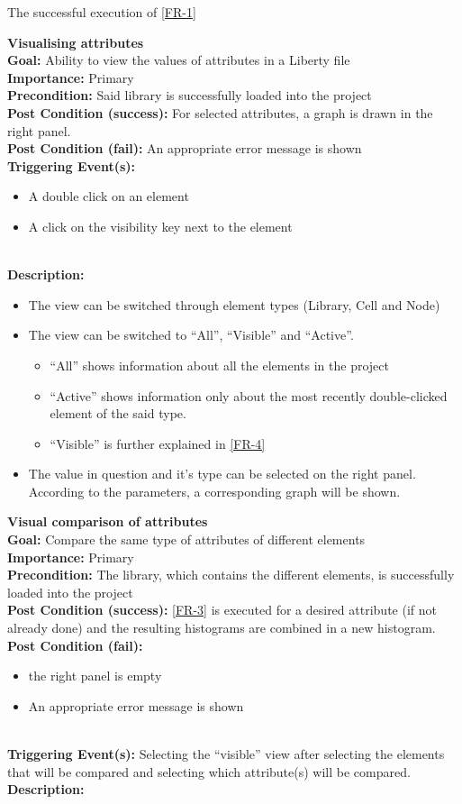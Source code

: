 \documentclass[10pt,a4paper]{report}
\newcommand{\precondition}[1]{
    \textbf{Precondition: } #1 \leavevmode \\
}
\newcommand{\FRDescription}[8]{
    \textbf{#1} \leavevmode \\
    \textbf{Goal: } #2 \leavevmode \\
    \textbf{Importance: } #3 \leavevmode \\
    \precondition{#4}
    \textbf{Post Condition (success): } #5 \leavevmode \\
    \textbf{Post Condition (fail): } #6 \leavevmode \\
    \textbf{Triggering Event(s): } #7 \leavevmode \\
    \textbf{Description: } \leavevmode \\ 
    #8}
\begin{document}
\begin{FR}
{\begin{itemize}
    \end{itemize}}
    {The successful execution of \ref{FR-1}}
    \item \FRDescription{Visualising attributes}
    {Ability to view the values of attributes in a Liberty file}
    {Primary}
    {Said library is successfully loaded into the project}
    {For selected attributes, a graph is drawn in the right panel.}
    {An appropriate error message is shown}
    {\begin{itemize}
        \item A double click on an element
        \item A click on the visibility key next to the element
    \end{itemize}}
    {\begin{itemize}
        \item The view can be switched through element types (Library, Cell and Node)
        \item The view can be switched to “All”, “Visible” and “Active”.
        \begin{itemize}
            \item “All” shows information about all the elements in the project
            \item “Active” shows information only about the most recently double-clicked element of the said type.
            \item “Visible” is further explained in \ref{FR-4}
        \end{itemize}
        \item The value in question and it’s type can be selected on the right panel. According to the parameters, a corresponding graph will be shown.
    \end{itemize}}
    \item \FRDescription{Visual comparison of attributes}
    {Compare the same type of attributes of different elements}
    {Primary}
    {The library, which contains the different elements,  is successfully loaded into the project}
    {\ref{FR-3} is executed for a desired attribute (if not already done) and the resulting histograms are combined in a new histogram.}
    {
    \begin{itemize}
        \item the right panel is empty
        \item An appropriate error message is shown
    \end{itemize}
    }
    {Selecting the “visible” view after selecting the elements that will be compared and selecting which attribute(s) will be compared.}

\end{FR}
\end{document}

